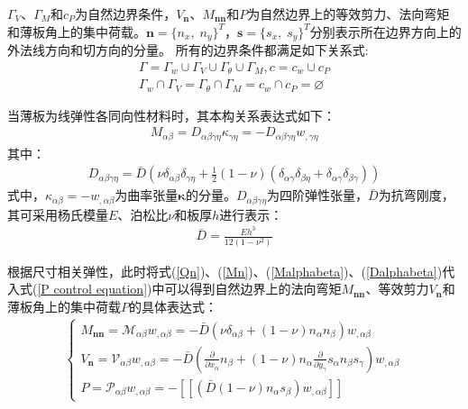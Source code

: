 $\Gamma_V$、$\Gamma_M$和$c_P$为自然边界条件，$V_{\boldsymbol n}$、$M_{\boldsymbol{nn}}$和$P$为自然边界上的等效剪力、法向弯矩和薄板角上的集中荷载。$\pmb{n}=\{n_x,\; n_y\}^T$，$\pmb{s}=\{s_x,\; s_y\}^T$分别表示所在边界方向上的外法线方向和切方向的分量。
所有的边界条件都满足如下关系式:
\begin{equation}\label{PGeometric relationships}
    \begin{split}
        \Gamma=\Gamma_w\cup\Gamma_V\cup\Gamma_{\theta}\cup\Gamma_M,c=c_w\cup c_P\\
        \Gamma_w\cap\Gamma_V=\Gamma_{\theta}\cap\Gamma_M=c_w\cap c_P=\varnothing
    \end{split}
\end{equation}\par
当薄板为线弹性各同向性材料时，其本构关系表达式如下：
\begin{equation}
    \begin{split}\label{Malphabeta}
        M_{\alpha\beta}=D_{\alpha\beta\gamma\eta}\kappa_{\gamma\eta}=-D_{\alpha\beta\gamma\eta}w_{,\gamma\eta}
    \end{split}
\end{equation}
其中：
\begin{equation}
    \begin{split}\label{Dalphabeta}
        D_{\alpha\beta\gamma\eta}=\bar D(\nu\delta_{\alpha\beta}\delta_{\gamma\eta}+\frac{1}{2}(1-\nu)(\delta_{\alpha\gamma}\delta_{\beta\eta}+\delta_{\alpha\gamma}\delta_{\beta\gamma}))
    \end{split}
\end{equation}
式中，$\kappa_{\alpha\beta}=-w_{,\alpha\beta}$为曲率张量$\boldsymbol \kappa$的分量。$D_{\alpha \beta \gamma \eta}$为四阶弹性张量，$\bar{D}$为抗弯刚度，其可采用杨氏模量$E$、泊松比$\nu$和板厚$h$进行表示：
\begin{equation}\label{kangwangangdu}
    \begin{split}
    \bar D=\frac{Eh^3}{12(1-\nu^2)}
\end{split}
\end{equation}\par
根据尺寸相关弹性\cite{Liu}，此时将式(\ref{Qn})、(\ref{Mn})、(\ref{Malphabeta})、(\ref{Dalphabeta})代入式(\ref{P control equation})中可以得到自然边界上的法向弯矩$M_{\pmb{nn}}$、等效剪力$V_{\pmb{n}}$和薄板角上的集中荷载$P$的具体表达式：
\begin{equation}
\begin{split}\label{MVP}
    \begin{cases}
        M_{\pmb{nn}}=\mathcal{M}_{\alpha\beta}w_{,\alpha\beta}=-\bar{D}(\nu\delta_{\alpha\beta}+(1-\nu)n_{\alpha}n_{\beta})w_{,\alpha\beta}\\
        V_{\pmb{n}}=\mathcal{V}_{\alpha\beta}w_{,\alpha\beta}=-\bar{D}(\frac{\partial}{\partial x_{\alpha}}n_{\beta}+(1-\nu)n_{\alpha}\frac{\partial}{\partial y_{\gamma}}s_{\alpha}n_{\beta}s_{\gamma})w_{,\alpha\beta}\\
        P=\mathcal{P}_{\alpha\beta}w_{,\alpha\beta}=-[[(\bar{D}(1-\nu)n_{\alpha}s_{\beta})w_{,\alpha\beta}]]
    \end{cases}
\end{split}
\end{equation}
